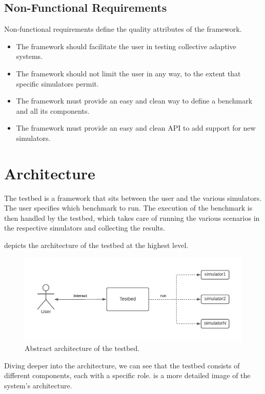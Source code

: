 \documentclass[12pt,a4paper,openright,twoside]{book}
\begin{document}
\subsection*{Non-Functional Requirements}
Non-functional requirements define the quality attributes of the framework.

\begin{itemize}
  \item The framework should facilitate the user in testing collective adaptive systems.
  \item The framework should not limit the user in any way, to the extent that specific simulators permit.
  \item The framework must provide an easy and clean way to define a benchmark and all its components.
  \item The framework must provide an easy and clean API to add support for new simulators.
\end{itemize}

\section{Architecture}

The testbed is a framework that sits between the user and the various simulators.
The user specifies which benchmark to run.
The execution of the benchmark is then handled by the testbed, which takes care of running the various scenarios in the respective simulators and collecting the results.

 depicts the architecture of the testbed at the highest level.

\begin{figure}[h!]
  \centering
  \includegraphics[width=\textwidth]{figures/architecture-high-level.pdf}
  \caption{Abstract architecture of the testbed.}
  \label{fig:high-level-architecture}
\end{figure}

Diving deeper into the architecture, we can see that the testbed consists of different components, each with a specific role.
 is a more detailed image of the system's architecture.
\end{document}
